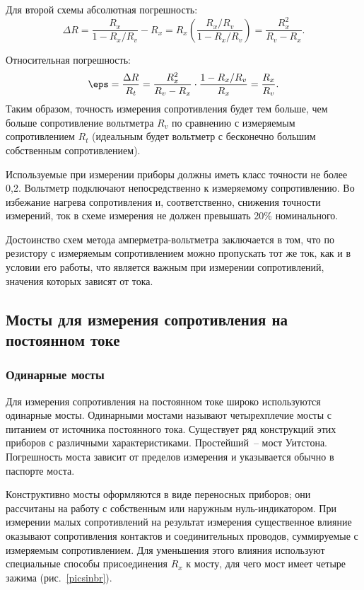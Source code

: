 \documentclass[pscyr,titlepage]{hedreport}
\newcommand{\Pic}[1]{\ref{pic#1}}
\newcommand{\pic}[1]{рис.~\Pic{#1}}
\begin{document}
  Для второй схемы абсолютная погрешность:
  \[
    \Delta R = \frac{R_x}{1 - R_x / R_v} - R_x = R_x \left( \frac{R_x / R_v}
      {1 - R_x / R_v} \right) = \frac{R_x^2}{R_v - R_x}.
  \]
  
  Относительная погрешность:
  \[
    \eps = \frac{\Delta R}{R_t} = \frac{R_x^2}{R_v - R_x} \cdot
      \frac{1 - R_x / R_v}{R_x} = \frac{R_x}{R_v}.
  \]
  Таким образом, точность измерения сопротивления будет тем больше, чем больше
  сопротивление вольтметра \( R_v \) по сравнению с измеряемым сопротивлением
  \( R_t \) (идеальным будет вольтметр с бесконечно большим собственным
  сопротивлением).

  Используемые при измерении приборы должны иметь класс точности не более 0,2.
  Вольтметр подключают непосредственно к измеряемому сопротивлению. Во избежание
  нагрева сопротивления и, соответственно, снижения точности измерений, ток в
  схеме измерения не должен превышать 20\% номинального.
  
  Достоинство схем метода амперметра-вольтметра заключается в том, что по
  резистору с измеряемым сопротивлением можно пропускать тот же ток, как и в
  условии его работы, что является важным при измерении сопротивлений, значения
  которых зависят от тока.
  
  \subsection{Мосты для измерения сопротивления на постоянном токе}
  
  \subsubsection{Одинарные мосты}  
  Для измерения сопротивления на постоянном токе широко используются одинарные 
  мосты. Одинарными мостами называют четырехплечие мосты с питанием от источника
  постоянного тока. Существует ряд конструкций этих приборов с различными
  характеристиками. Простейший~-- мост Уитстона. Погрешность моста зависит от
  пределов измерения и указывается обычно в паспорте моста.
  
  Конструктивно мосты оформляются в виде переносных приборов; они рассчитаны на
  работу с собственным или наружным нуль-индикатором. При измерении малых
  сопротивлений на результат измерения существенное влияние оказывают
  сопротивления контактов и соединительных проводов, суммируемые с измеряемым
  сопротивлением. Для уменьшения этого влияния используют специальные способы
  присоединения \( R_x \) к мосту, для чего мост имеет четыре зажима
  (\pic{sinbr}).
  
\end{document}
